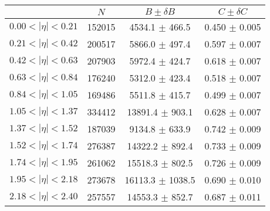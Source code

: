 \begin{tabular}{lccc}
\hline
    &   $N$   & $B \pm \delta B$  &  $C \pm \delta C$ \\
\hline
$0.00 < |\eta| <0.21$          & 152015     & 4534.1     $\pm$ 466.5 & 0.450      $\pm$ 0.005 \\
$0.21 < |\eta| <0.42$          & 200517     & 5866.0     $\pm$ 497.4 & 0.597      $\pm$ 0.007 \\
$0.42 < |\eta| <0.63$          & 207903     & 5972.4     $\pm$ 424.7 & 0.618      $\pm$ 0.007 \\
$0.63 < |\eta| <0.84$          & 176240     & 5312.0     $\pm$ 423.4 & 0.518      $\pm$ 0.007 \\
$0.84 < |\eta| <1.05$          & 169486     & 5511.8     $\pm$ 415.7 & 0.499      $\pm$ 0.007 \\
$1.05 < |\eta| <1.37$          & 334412     & 13891.4    $\pm$ 903.1 & 0.628      $\pm$ 0.007 \\
$1.37 < |\eta| <1.52$          & 187039     & 9134.8     $\pm$ 633.9 & 0.742      $\pm$ 0.009 \\
$1.52 < |\eta| <1.74$          & 276387     & 14322.2    $\pm$ 892.4 & 0.733      $\pm$ 0.009 \\
$1.74 < |\eta| <1.95$          & 261062     & 15518.3    $\pm$ 802.5 & 0.726      $\pm$ 0.009 \\
$1.95 < |\eta| <2.18$          & 273678     & 16113.3    $\pm$ 1038.5 & 0.690      $\pm$ 0.010 \\
$2.18 < |\eta| <2.40$          & 257557     & 14553.3    $\pm$ 852.7 & 0.687      $\pm$ 0.011 \\
\hline
\end{tabular}
